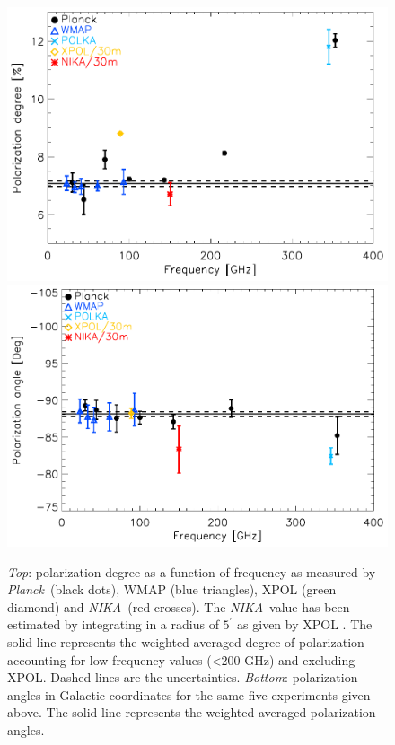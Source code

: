 \documentclass[twocolumn,traditabstract]{aa}
\def\NIKA{\textit{NIKA}}
\def\Planck{\textit{Planck}}
\begin{document}
\begin{figure}
  \centering
          { \includegraphics[width=1\linewidth,keepaspectratio]{figures/pdegree_comparison.pdf}}
          { \includegraphics[width=1\linewidth,keepaspectratio]{figures/angle_comparison.pdf}} 
            \caption{{\it Top}: polarization degree as a function of frequency as measured by \Planck\ (black dots), WMAP (blue triangles), XPOL (green diamond) and \NIKA\ (red crosses). The \NIKA\ value has been estimated by integrating in a radius of $5^{\prime}$ as given by XPOL \citep{aumont2010}. The solid line represents the weighted-averaged degree of polarization accounting for low frequency values (\textless 200 GHz) and excluding XPOL.
            Dashed lines are the uncertainties.
            {\it Bottom}: polarization angles in Galactic coordinates for the same five experiments given above. The solid line represents the weighted-averaged polarization angles.} %
\label{crab_p_angle_comparison}		
  \end{figure}
\end{document}

